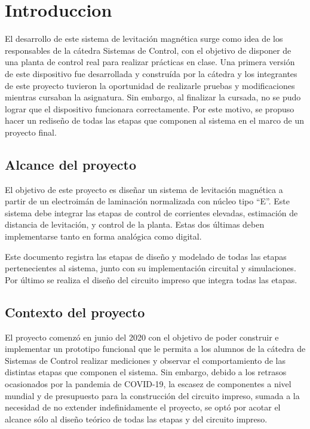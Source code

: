 \chapter{Introduccion}  \label{cap:Introducción}

\noindent El desarrollo de este sistema de levitación magnética surge como idea de los responsables de la cátedra Sistemas de Control, con el objetivo de disponer de una planta de control real para realizar prácticas en clase. Una primera versión de este dispositivo fue desarrollada y construída por la cátedra y los integrantes de este proyecto tuvieron la oportunidad de realizarle pruebas y modificaciones mientras cursaban la asignatura. Sin embargo, al finalizar la cursada, no se pudo lograr que el dispositivo funcionara correctamente. Por este motivo,  se propuso hacer un rediseño de todas las etapas que componen al sistema en el marco de un proyecto final.


\section{Alcance del proyecto}

\noindent El objetivo de este proyecto es diseñar un sistema de levitación magnética a partir de un electroimán de laminación normalizada con núcleo tipo “E''. Este sistema debe integrar las etapas de control de corrientes elevadas, estimación de distancia de levitación, y control de la planta. Estas dos últimas deben implementarse tanto en forma analógica como digital.

\noindent Este documento registra las etapas de diseño y modelado de todas las etapas pertenecientes al sistema, junto con su implementación circuital y simulaciones. Por último se realiza el diseño del circuito impreso que integra todas las etapas.


\section{Contexto del proyecto}

\noindent El proyecto comenzó en junio del 2020 con el objetivo de poder construir e implementar un prototipo funcional que le permita a los alumnos de la cátedra de Sistemas de Control realizar mediciones y observar el comportamiento de las distintas etapas que componen el sistema. Sin embargo, debido a los retrasos ocasionados por la pandemia de COVID-19,  la escasez de componentes a nivel mundial y de presupuesto para la construcción del circuito impreso, sumada a la  necesidad de no extender indefinidamente el proyecto, se optó por acotar el alcance sólo al diseño teórico de todas las etapas y del circuito impreso.

